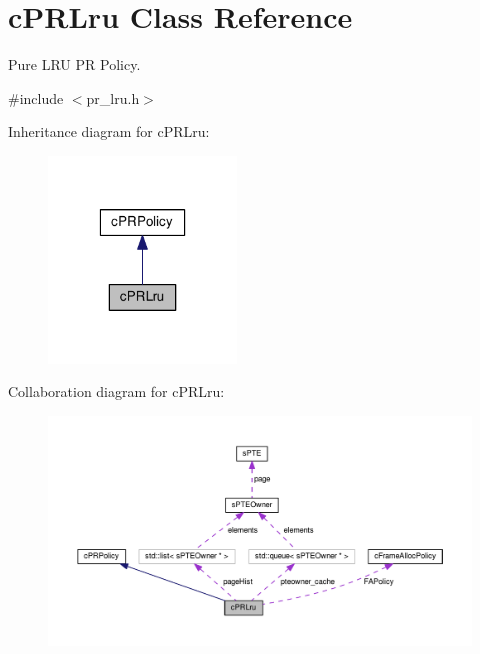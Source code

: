 \hypertarget{classcPRLru}{\section{c\-P\-R\-Lru \-Class \-Reference}
\label{da/da5/classcPRLru}
}


\-Pure \-L\-R\-U \-P\-R \-Policy.  




{\ttfamily \#include $<$pr\-\_\-lru.\-h$>$}



\-Inheritance diagram for c\-P\-R\-Lru\-:\nopagebreak
\begin{figure}[H]
\begin{center}
\leavevmode
\includegraphics[width=142pt]{d9/da4/classcPRLru__inherit__graph}
\end{center}
\end{figure}


\-Collaboration diagram for c\-P\-R\-Lru\-:\nopagebreak
\begin{figure}[H]
\begin{center}
\leavevmode
\includegraphics[width=350pt]{da/d0b/classcPRLru__coll__graph}
\end{center}
\end{figure}
